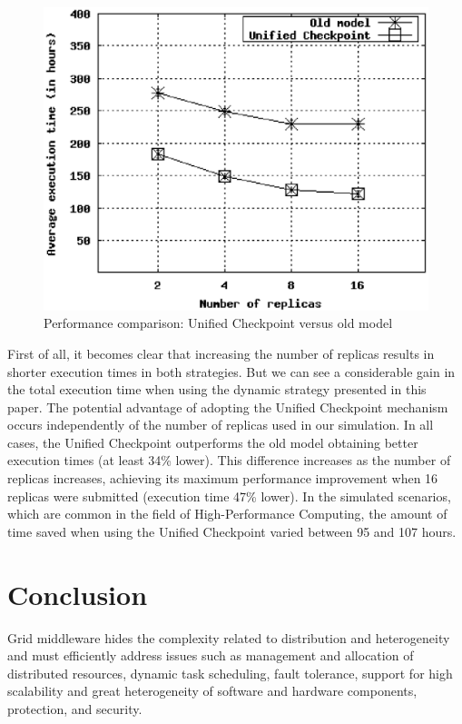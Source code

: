 \documentclass[times, 09pt, twocolumn]{article}
\begin{document}
\begin{figure}[th]
\centering \includegraphics[width=1.1\columnwidth]{49-55_scenario.eps}
\caption{Performance comparison: Unified Checkpoint versus old model}
\label{fig:adapt-mag}
\end{figure}

First of all, it becomes clear that increasing the number of replicas results
in shorter execution times in both strategies. But we can see a considerable
gain in the total execution time when using the dynamic strategy presented in
this paper. The potential advantage of adopting the Unified Checkpoint
mechanism occurs independently of the number of replicas used in our
simulation. In all cases, the Unified Checkpoint outperforms the old model
obtaining better execution times (at least 34\% lower). This difference
increases as the number of replicas increases, achieving its maximum
performance improvement when 16 replicas were submitted (execution time 47\%
lower).  In the simulated scenarios, which are common in the field of
High-Performance Computing, the amount of time saved when using the Unified
Checkpoint varied between 95 and 107 hours.

\section{Conclusion}

Grid middleware hides the complexity related to distribution and
heterogeneity and must efficiently address issues such as management
and allocation of distributed resources, dynamic task scheduling, fault
tolerance, support for high scalability and great heterogeneity of software and
hardware components, protection, and security. 
\end{document}
